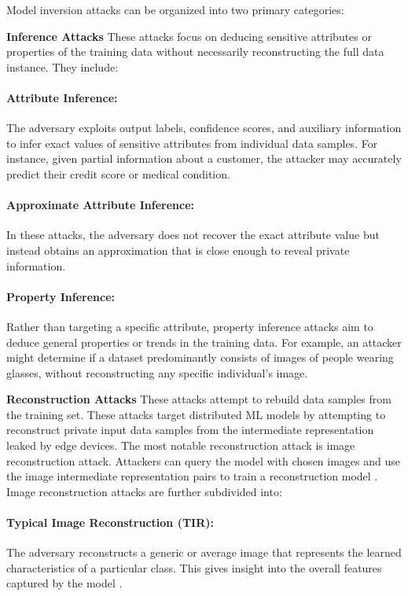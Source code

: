 \documentclass[conference]{IEEEtran}
\begin{document}
Model inversion attacks can be organized into two primary categories:

\textbf{Inference Attacks}
These attacks focus on deducing sensitive attributes or properties of the training data without necessarily reconstructing the full data instance. They include:

\paragraph{Attribute Inference:}
The adversary exploits output labels, confidence scores, and auxiliary information to infer exact values of sensitive attributes from individual data samples. For instance, given partial information about a customer, the attacker may accurately predict their credit score or medical condition.

\paragraph{Approximate Attribute Inference:}
In these attacks, the adversary does not recover the exact attribute value but instead obtains an approximation that is close enough to reveal private information.

\paragraph{Property Inference:}
Rather than targeting a specific attribute, property inference attacks aim to deduce general properties or trends in the training data. For example, an attacker might determine if a dataset predominantly consists of images of people wearing glasses, without reconstructing any specific individual’s image.
\setcounter{paragraph}{0}

\textbf{Reconstruction Attacks}
These attacks attempt to rebuild data samples from the training set. 
These attacks target distributed ML models by attempting to reconstruct private input data samples from the intermediate representation leaked by edge devices. The most notable reconstruction attack is image reconstruction attack. Attackers can query the model with chosen images and use the image intermediate representation pairs to train a reconstruction model \cite{benkraouda2021image}. Image reconstruction attacks are further subdivided into:

\paragraph{Typical Image Reconstruction (TIR):}
The adversary reconstructs a generic or average image that represents the learned characteristics of a particular class. This gives insight into the overall features captured by the model \cite{dibbo2023sok}.
\end{document}
